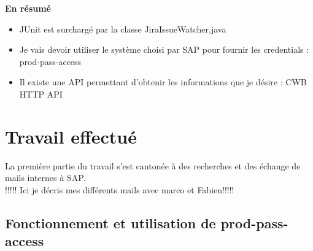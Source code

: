 \textbf{En résumé}\hfill \\ \indent 
\begin{itemize}
	\item JUnit est surchargé par la classe JiraIssueWatcher.java
	\item Je vais devoir utiliser le système choisi par SAP pour fournir les credentials : \Large{prod-pass-access}\normalsize
	\item Il existe une API permettant d'obtenir les informations que je désire : \Large{CWB HTTP API}\normalsize
\end{itemize}




\section{Travail effectué}


La première partie du travail s'est cantonée à des recherches et des échange de mails internes à SAP.\\

!!!!!  Ici je décris mes différents mails avec marco et Fabien!!!!!\\


\subsection{Fonctionnement et utilisation de prod-pass-access}






